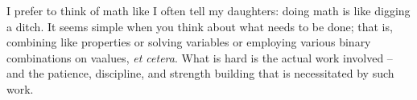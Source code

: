 \documentclass{book}
\begin{document}
I prefer to think of math like I often tell my daughters: doing math is like digging a ditch. It seems simple when you think about what needs to be done; that is, combining like properties or solving variables or employing various binary combinations on vaalues, \textsl{et cetera}. What is hard is the actual work involved -- and the patience, discipline, and strength building that is necessitated by such work. 










\printindex
\end{document}
